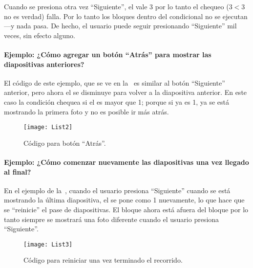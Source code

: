 Cuando se presiona otra vez ``Siguiente'', el  vale 3
por lo tanto el chequeo ($3 < 3$ no es verdad) falla. Por lo tanto los
bloques dentro del condicional no se ejecutan---y nada pasa. De hecho,
el usuario puede seguir presionando ``Siguiente'' mil veces, sin
efecto alguno.

\paragraph{Ejemplo: ¿Cómo agregar un botón ``Atrás'' para mostrar las
  diapositivas anteriores?}

El código de este ejemplo, que se ve en la~ es similar
al botón ``Siguiente'' anterior, pero ahora el  se
disminuye para volver a la diapositiva anterior. En este caso la
condición chequea si el  es mayor que 1; porque si ya
es 1, ya se está mostrando la primera foto y no es posible ir más
atrás.

\begin{figure}[H]
  \centering
  \texttt{[image: List2]}  
  \caption{Código para botón ``Atrás''.}
  \label{fig:List2}
\end{figure}

\paragraph{Ejemplo: ¿Cómo comenzar nuevamente las diapositivas una vez
llegado al final?}

En el ejemplo de la~, cuando el usuario presiona
``Siguiente'' cuando se está mostrando la última diapositiva, el
 se pone como 1 nuevamente, lo que hace que se
``reinicie'' el pase de diapositivas. El bloque  ahora está afuera del bloque  por lo
tanto siempre se mostrará una foto diferente cuando el usuario
presiona ``Siguiente''.

\begin{figure}[H]
  \centering
  \texttt{[image: List3]}  
  \caption{Código para reiniciar una vez terminado el recorrido.}
  \label{fig:List3}
\end{figure}
